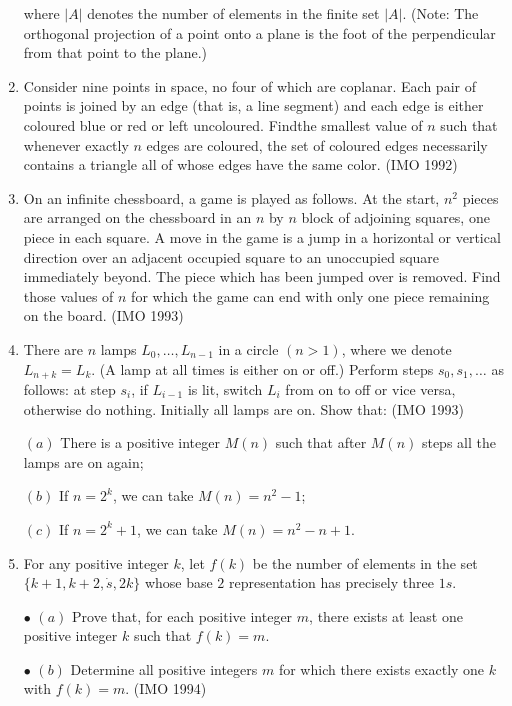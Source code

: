 \begin{enumerate}
 where $|A|$ denotes the number of elements in the finite set $|A|$. (Note: The orthogonal projection of a point onto a plane is the foot of the perpendicular from that point to the plane.)
\item Consider nine points in space, no four of which are coplanar. Each pair of points is joined by an edge (that is, a line segment) and each edge is either coloured blue or red or left uncoloured. Findthe smallest value of $n$ such that whenever exactly $n$ edges are coloured, the set of coloured edges necessarily contains a triangle all of whose edges have the same color. \hfill(IMO 1992)
\item On an infinite chessboard, a game is played as follows. At the start, $n^{2}$ pieces are arranged on the chessboard in an $n$ by $n$ block of adjoining squares, one piece in each square. A move in the game is a jump in a horizontal or vertical direction over an adjacent occupied square to an unoccupied square immediately beyond. The piece which has  been jumped over is removed.                        
 Find those values of $n$ for which the game can end with only one piece remaining on the board.  \hfill(IMO 1993)
\item There are $n$ lamps $L_0, \dots , L_{ n-1 }$  in a circle $(n > 1) $, where we denote $L_{n+k} =  L_k$. (A lamp at all times is either on or off.) Perform steps $s_0, s_1, \dots $ as follows: at step $s_i$, if $L_{i-1}$ is lit, switch $L_i$ from on to off or vice versa, otherwise do nothing. Initially all lamps are on. Show that:            \hfill(IMO 1993)                                                  

$(a)$ There is a positive integer $M(n)$ such that     after $M(n)$ steps all the lamps are on again;                                                           

 $(b)$ If $n = 2^{k}$, we can take $M(n) = n^{2}-1$;                                                          

$(c)$ If $n = 2^{k}+1$, we can take $M(n) = n^{2}-n+1$.   

\item For any positive integer $k$, let $f(k)$ be the number of elements in the set $\{ k+1, k+2, \dot s, 2k \}$ whose base $2$ representation has precisely three $1s$.
 
  $\bullet$ $(a)$ Prove that, for each positive integer $m$, there exists at least one positive integer $k$ such that $f(k)=m$.
 
		 $\bullet$ $(b)$ Determine all positive integers $m$ for which there exists exactly one $k$ with $f(k)= m$.     \hfill(IMO 1994)
\end{enumerate}

